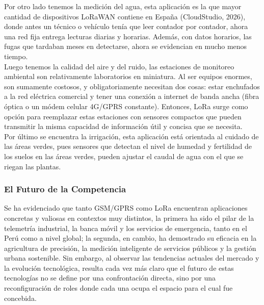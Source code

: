 \documentclass[12pt,a4paper]{article}
\begin{document}
	Por otro lado tenemos la medición del agua, esta aplicación es la que mayor cantidad de dispositivos LoRaWAN contiene en España (CloudStudio, 2026), donde antes un técnico o vehículo tenía que leer contador por contador, ahora una red fija entrega lecturas diarias y horarias. Además, con datos horarios, las fugas que tardaban meses en detectarse, ahora se evidencian en mucho menos tiempo.\\
	
	Luego tenemos la calidad del aire y del ruido, las estaciones de monitoreo ambiental son relativamente laboratorios en miniatura. Al ser equipos enormes, son sumamente costosos, y obligatoriamente necesitan dos cosas: estar enchufados a la red eléctrica comercial y tener una conexión a internet de banda ancha (fibra óptica o un módem celular 4G/GPRS constante). Entonces, LoRa surge como opción para reemplazar estas estaciones con sensores compactos que pueden transmitir la misma capacidad de información útil y concisa que se necesita.\\
	
	Por último se encuentra la irrigación, esta aplicación está orientada al cuidado de las áreas verdes, pues sensores que detectan el nivel de humedad y fertilidad de los suelos en las áreas verdes, pueden ajustar el caudal de agua con el que se riegan las plantas.\\
	
	\subsubsection{ El Futuro de la Competencia}

	Se ha evidenciado que tanto GSM/GPRS como LoRa encuentran aplicaciones concretas y valiosas en contextos muy distintos, la primera ha sido el pilar de la telemetría industrial, la banca móvil y los servicios de emergencia, tanto en el Perú como a nivel global; la segunda, en cambio, ha demostrado su eficacia en la agricultura de precisión, la medición inteligente de servicios públicos y la gestión urbana sostenible. Sin embargo, al observar las tendencias actuales del mercado y la evolución tecnológica, resulta cada vez más claro que el futuro de estas tecnologías no se define por una confrontación directa, sino por una reconfiguración de roles donde cada una ocupa el espacio para el cual fue concebida.\\
\end{document}
